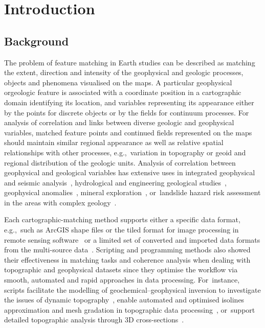 \documentclass[minerals,article,accept,pdftex,moreauthors]{Definitions/mdpi}
\begin{document}
\section{Introduction}
\unskip

\subsection{Background}

The problem of feature matching in Earth studies can be described as matching the extent, direction and intensity of the geophysical and geologic processes, objects and phenomena visualised on the maps. {A} particular{ }geophysical{ or}geologic {feature} is associated with a coordinate position in {a} cartographic domain{ identifying its location, }and { }variables {representing its} appearance{ either by the points for discrete objects or by the fields for continuum processes. }For analysis of correlation and links between diverse geologic and geophysical variables, matched feature points and continued fields represented on the maps should maintain  similar regional appearance as well as relative spatial relationships with other processes, e.g.,~variation in topography or geoid and regional distribution of the geologic units. Analysis of correlation between geophysical and geological variables has extensive uses in integrated geophysical and seismic analysis~\cite{NDAMNJIKAM2023104816}, hydrological and engineering geological studies~\cite{AMPONSAH2022104558,info14040249,jmse11040871}, geophysical anomalies~\cite{MATENDE2023104766}, mineral exploration~\cite{STEUER2020104172}, or~landslide hazard risk assessment in the areas with complex geology~\cite{CALAMITA2023106984,DIMAIO2020105473}.

Each cartographic-matching method supports either a specific data format, e.g.,~such as {ArcGIS shape files} \cite{LAR2023e01436,NGENE2022360,CHENG2022106052} or the tiled format for image processing in remote sensing software~\cite{KONWEA2023e01597,ALKHERSAN2022104678} or a limited set of converted and imported data formats from the multi-source data~\cite{SAHA2022104706,APEH2022104561,SHEBL2022765}. Scripting and programming methods also showed their effectiveness in matching tasks and coherence analysis when dealing with topographic and geophysical datasets since they optimise the workflow via smooth, automated and rapid approaches in data processing. %
For~instance, scripts facilitate the modelling of geochemical--geophysical inversion to investigate the issues of dynamic topography~\cite{Jones}, enable automated and optimised isolines approximation and mesh gradation in topographic data processing~\cite{GORMAN20081721}, or~support detailed topographic analysis through 3D cross-sections~\cite{Sobh,Lemenkova202301}.
\end{document}

